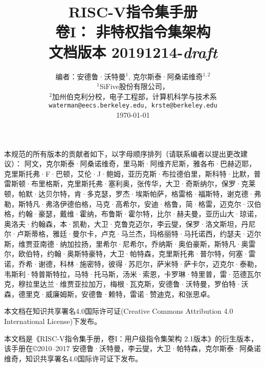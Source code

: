 \documentclass[twoside,11pt]{book}
\newcommand{\specrev}{\mbox{20191214-{\em draft}}}
\newcommand{\specmonthyear}{\mbox{December 2019}}
\begin{document}
\title{\vspace{-0.7in}\Large {\bf RISC-V指令集手册} \\
  \large {\bf 卷I： 非特权指令集架构} \\
  文档版本 \specrev
  \vspace{-0.1in}}

\author{编者：安德鲁·沃特曼$^{1}$, 克尔斯泰·阿桑诺维奇$^{1,2}$ \\
  $^{1}$SiFive股份有限公司， \\
  $^{2}$加州伯克利分校，电子工程部，计算机科学与技术系\\
  {\tt waterman@eecs.berkeley.edu, krste@berkeley.edu} \\
  \today
}
\date{} 
\maketitle


\setlength{\parindent}{2em}

本规范的所有版本的贡献者如下，以字母顺序排列（请联系编者以提出更改建议）：
阿文，克尔斯泰·阿桑诺维奇，里马斯·阿维齐尼斯，雅各布·巴赫迈耶，克里斯托弗·F·巴顿，艾伦·J·鲍姆，亚历克斯·布拉德伯里，斯科特·比默，普雷斯顿·布里格斯，克里斯托弗·塞利奥，张传华，大卫·奇斯纳尔，保罗·克莱顿，帕默·达贝尔特，肯·多克瑟，罗杰·埃斯帕萨，格雷格·福斯特，谢克德·弗勒，斯特凡·弗洛伊德伯格，马克·高希尔，安迪·格鲁，简·格雷，迈克尔·汉伯格，约翰·豪瑟，戴维·霍纳，布鲁斯·霍尔特，比尔·赫夫曼，亚历山大·琼诺，奥洛夫·约翰森，本·凯勒，大卫·克鲁克迈尔，李云燮，保罗·洛文斯坦，丹尼尔·卢斯蒂格，雅廷·曼尔卡，卢克·马兰杰，玛格丽特·马托诺西，约瑟夫·迈尔斯，维贾亚南德·纳加拉扬，里希尔·尼希尔，乔纳斯·奥伯豪斯，斯特凡·奥雷尔，欧伯特，约翰·奥斯特豪特，大卫·帕特森，克里斯托弗·普尔特，何塞·雷诺，乔希·谢德，科林·施密特，彼得·苏厄尔，萨米特·萨卡尔，迈克尔·泰勒，韦斯利·特普斯特拉，马特·托马斯，汤米·索恩，卡罗琳·特里普，雷·范德瓦尔克，穆拉里达兰·维贾亚拉加万，梅根·瓦克斯，安德鲁·沃特曼，罗伯特·沃森，德里克·威廉姆斯，安德鲁·赖特，雷诺·赞迪克，和张思卓。


本文档在知识共享署名4.0国际许可证(Creative Commons Attribution 4.0 International License)下发布。


本文档是《RISC-V指令集手册，卷I：用户级指令集架构 2.1版本》的衍生版本，
该手册在\copyright 2010--2017 安德鲁·沃特曼，李云燮，大卫·帕特森，克尔斯泰·阿桑诺维奇，知识共享署名4.0国际许可证下发布。 

\end{document}

